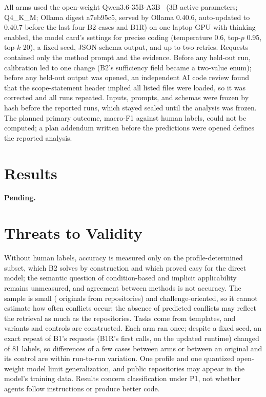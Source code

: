 All arms used the open-weight Qwen3.6-35B-A3B~\cite{qwen36} (3B active parameters; Q4\_K\_M; Ollama digest a7eb95c5,
served by Ollama 0.40.6, auto-updated to 0.40.7 before the last four B2 cases and B1R) on one laptop GPU with thinking
enabled, the model card's settings for precise coding (temperature 0.6, top-$p$ 0.95, top-$k$ 20), a fixed seed,
JSON-schema output, and up to two retries. Requests contained only the method prompt and the evidence. Before any
held-out run, calibration led to one change (B2's sufficiency field became a two-value enum); before any held-out output
was opened, an independent AI code review found that the scope-statement header implied all listed files were loaded,
so it was corrected and all runs repeated. Inputs, prompts, and schemas were frozen by hash before the reported runs,
which stayed sealed until the analysis was frozen. The planned primary outcome, macro-F1 against human labels, could not
be computed; a plan addendum written before the predictions were opened defines the reported analysis.

\section{Results}\label{sec:results}
\ifresults\else\textbf{Pending.} \PendingReason\fi

\section{Threats to Validity}\label{sec:threats}
Without human labels, accuracy is measured only on the profile-determined subset, which B2 solves by construction and
which proved easy for the direct model; the semantic question of condition-based and implicit applicability remains
unmeasured, and agreement between methods is not accuracy. The sample is small (\NOriginals{} originals from
\NEvalReposWord{} repositories) and challenge-oriented, so it cannot estimate how often conflicts occur; the absence of
predicted conflicts may reflect the retrieval as much as the repositories. Tasks come from templates, and variants and
controls are constructed. Each arm ran once; despite a fixed seed, an exact repeat of B1's requests (B1R's first calls,
on the updated runtime) changed \RepeatDiffTotal{} of 81 labels, so differences of a few cases between arms or between
an original and its control are within run-to-run variation. One profile and one quantized open-weight model limit
generalization, and public repositories may appear in the model's training data. Results concern classification under P1, not whether agents follow instructions or produce
better code.


